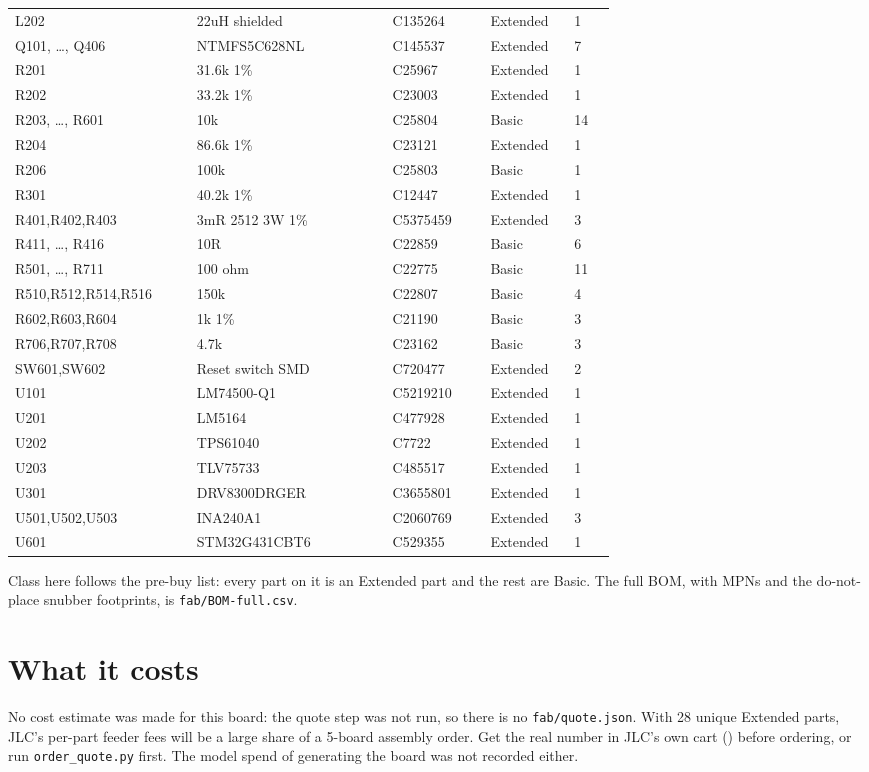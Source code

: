 \begin{hsblock}
{\begin{tabular}{L{0.26\linewidth} L{0.28\linewidth} L{0.14\linewidth} L{0.12\linewidth} L{0.06\linewidth}}
L202 & 22uH shielded & C135264 & Extended & 1 \\
Q101, \ldots, Q406 & NTMFS5C628NL & C145537 & Extended & 7 \\
R201 & 31.6k 1\% & C25967 & Extended & 1 \\
R202 & 33.2k 1\% & C23003 & Extended & 1 \\
R203, \ldots, R601 & 10k & C25804 & Basic & 14 \\
R204 & 86.6k 1\% & C23121 & Extended & 1 \\
R206 & 100k & C25803 & Basic & 1 \\
R301 & 40.2k 1\% & C12447 & Extended & 1 \\
R401,R402,R403 & 3mR 2512 3W 1\% & C5375459 & Extended & 3 \\
R411, \ldots, R416 & 10R & C22859 & Basic & 6 \\
R501, \ldots, R711 & 100 ohm & C22775 & Basic & 11 \\
R510,R512,R514,R516 & 150k & C22807 & Basic & 4 \\
R602,R603,R604 & 1k 1\% & C21190 & Basic & 3 \\
R706,R707,R708 & 4.7k & C23162 & Basic & 3 \\
SW601,SW602 & Reset switch SMD & C720477 & Extended & 2 \\
U101 & LM74500-Q1 & C5219210 & Extended & 1 \\
U201 & LM5164 & C477928 & Extended & 1 \\
U202 & TPS61040 & C7722 & Extended & 1 \\
U203 & TLV75733 & C485517 & Extended & 1 \\
U301 & DRV8300DRGER & C3655801 & Extended & 1 \\
U501,U502,U503 & INA240A1 & C2060769 & Extended & 3 \\
U601 & STM32G431CBT6 & C529355 & Extended & 1 \\
\hline
\end{tabular}}
\end{hsblock}

Class here follows the pre-buy list: every part on it is an Extended part and
the rest are Basic. The full BOM, with MPNs and the do-not-place snubber
footprints, is \texttt{fab/BOM-full.csv}.

\section{What it costs}

No cost estimate was made for this board: the quote step was not run, so
there is no \texttt{fab/quote.json}. With 28 unique Extended parts, JLC's
per-part feeder fees will be a large share of a 5-board assembly order. Get the
real number in JLC's own cart () before
ordering, or run \texttt{order\_quote.py} first. The model spend of generating
the board was not recorded either.

